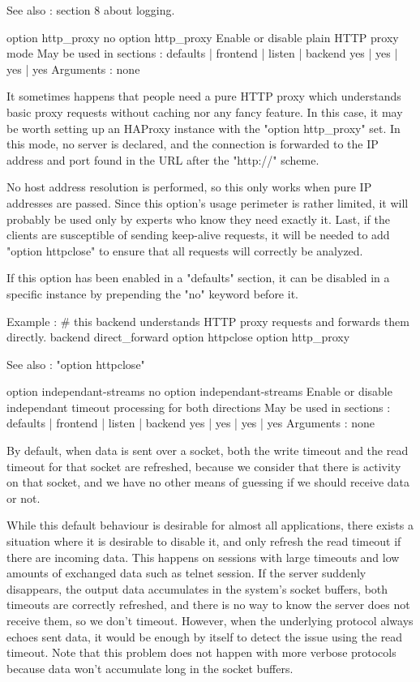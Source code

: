   See also :  section 8 about logging.


option http_proxy
no option http_proxy
  Enable or disable plain HTTP proxy mode
  May be used in sections :   defaults | frontend | listen | backend
                                 yes   |    yes   |   yes  |   yes
  Arguments : none

  It sometimes happens that people need a pure HTTP proxy which understands
  basic proxy requests without caching nor any fancy feature. In this case,
  it may be worth setting up an HAProxy instance with the "option http_proxy"
  set. In this mode, no server is declared, and the connection is forwarded to
  the IP address and port found in the URL after the "http://" scheme.

  No host address resolution is performed, so this only works when pure IP
  addresses are passed. Since this option's usage perimeter is rather limited,
  it will probably be used only by experts who know they need exactly it. Last,
  if the clients are susceptible of sending keep-alive requests, it will be
  needed to add "option httpclose" to ensure that all requests will correctly
  be analyzed.

  If this option has been enabled in a "defaults" section, it can be disabled
  in a specific instance by prepending the "no" keyword before it.

  Example :
    # this backend understands HTTP proxy requests and forwards them directly.
    backend direct_forward
        option httpclose
        option http_proxy

  See also : "option httpclose"


option independant-streams
no option independant-streams
  Enable or disable independant timeout processing for both directions
  May be used in sections :   defaults | frontend | listen | backend
                                 yes   |    yes   |   yes  |  yes
  Arguments : none

  By default, when data is sent over a socket, both the write timeout and the
  read timeout for that socket are refreshed, because we consider that there is
  activity on that socket, and we have no other means of guessing if we should
  receive data or not.

  While this default behaviour is desirable for almost all applications, there
  exists a situation where it is desirable to disable it, and only refresh the
  read timeout if there are incoming data. This happens on sessions with large
  timeouts and low amounts of exchanged data such as telnet session. If the
  server suddenly disappears, the output data accumulates in the system's
  socket buffers, both timeouts are correctly refreshed, and there is no way
  to know the server does not receive them, so we don't timeout. However, when
  the underlying protocol always echoes sent data, it would be enough by itself
  to detect the issue using the read timeout. Note that this problem does not
  happen with more verbose protocols because data won't accumulate long in the
  socket buffers.

